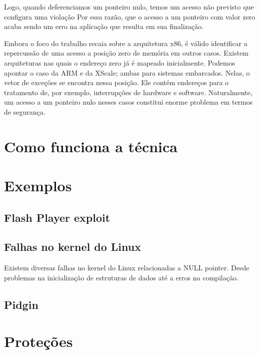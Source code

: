 		Logo, quando deferenciamos um ponteiro nulo, temos um acesso não previsto
		que configura uma violação 
		Por essa razão, que o acesso a um ponteiro com valor
		zero acaba sendo um erro na aplicação que resulta em sua finalização.
		
		Embora o foco do trabalho recaia sobre a arquitetura x86, é válido identificar a repercussão
		de uma acesso a posição zero de memória em outros casos.
		Existem arquiteturas nas quais o endereço zero já é mapeado inicialmente. 
		Podemos apontar o caso da ARM e da XScale; ambas para sistemas embarcados. 
		Nelas, o vetor de exceções se encontra nessa posição. Ele contém
		endereços para o tratamento de, por exemplo, interrupções de hardware e software.
		Naturalmente, um acesso a um ponteiro nulo nesses casos constitui enorme
		problema em termos de segurança.

		

	\section{Como funciona a técnica}

	\section{Exemplos}

	\subsection{Flash Player exploit}
	
	\subsection{Falhas no kernel do Linux}
		Existem diversas falhas no kernel do Linux relacionadas a NULL pointer.
		Desde problemas na inicialização de estruturas de dados até a erros na compilação.		
	
	\subsection{Pidgin}

	\section{Proteções}
